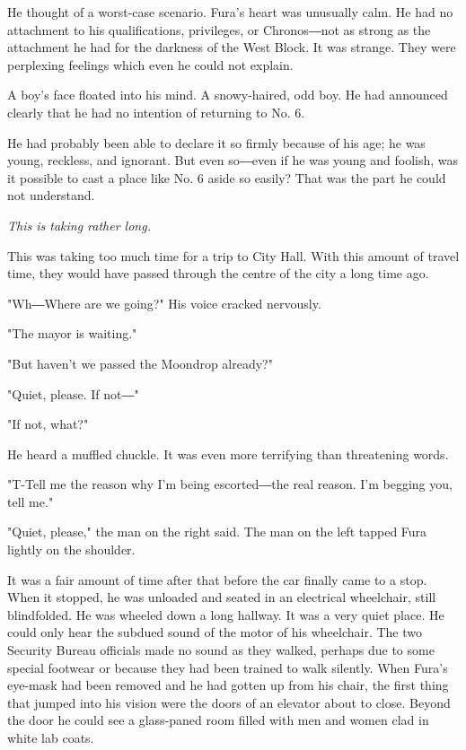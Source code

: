 He thought of a worst-case scenario. Fura's heart was unusually calm. He
had no attachment to his qualifications, privileges, or Chronos―not as
strong as the attachment he had for the darkness of the West Block. It
was strange. They were perplexing feelings which even he could not
explain.

A boy's face floated into his mind. A snowy-haired, odd boy. He had
announced clearly that he had no intention of returning to No. 6.

He had probably been able to declare it so firmly because of his age; he
was young, reckless, and ignorant. But even so―even if he was young and
foolish, was it possible to cast a place like No. 6 aside so easily?
That was the part he could not understand.

\emph{This is taking rather long.}

This was taking too much time for a trip to City Hall. With this amount
of travel time, they would have passed through the centre of the city a
long time ago.

"Wh―Where are we going?" His voice cracked nervously.

"The mayor is waiting."

"But haven't we passed the Moondrop already?"

"Quiet, please. If not―"

"If not, what?"

He heard a muffled chuckle. It was even more terrifying than threatening
words.

"T-Tell me the reason why I'm being escorted―the real reason. I'm
begging you, tell me."

"Quiet, please," the man on the right said. The man on the left tapped
Fura lightly on the shoulder.

It was a fair amount of time after that before the car finally came to a
stop. When it stopped, he was unloaded and seated in an electrical
wheelchair, still blindfolded. He was wheeled down a long hallway. It
was a very quiet place. He could only hear the subdued sound of the
motor of his wheelchair. The two Security Bureau officials made no sound
as they walked, perhaps due to some special footwear or because they had
been trained to walk silently. When Fura's eye-mask had been removed and
he had gotten up from his chair, the first thing that jumped into his
vision were the doors of an elevator about to close. Beyond the door he
could see a glass-paned room filled with men and women clad in white lab
coats.


